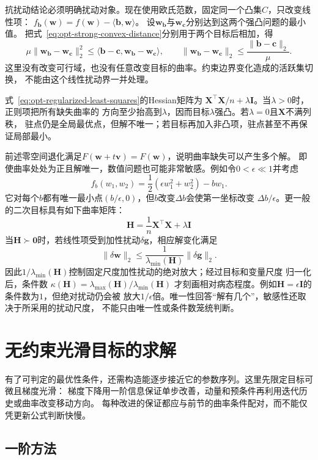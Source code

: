 抗扰动结论必须明确扰动对象。现在使用欧氏范数，固定同一个凸集$C$，只改变线性项：
$f_{\bm b}(\bm w)=f(\bm w)-\langle\bm b,\bm w\rangle$。
设$\bm w_{\bm b}$与$\bm w_{\bm c}$分别达到这两个强凸问题的最小值。
把式~\eqref{eq:opt-strong-convex-distance}分别用于两个目标后相加，得
\[
 \mu\|\bm w_{\bm b}-\bm w_{\bm c}\|_2^2
 \leq\langle\bm b-\bm c,\bm w_{\bm b}-\bm w_{\bm c}\rangle,
 \qquad
 \|\bm w_{\bm b}-\bm w_{\bm c}\|_2\leq\frac{\|\bm b-\bm c\|_2}{\mu}.
\]
这里没有改变可行域，也没有任意改变目标的曲率。约束边界变化造成的活跃集切换，
不能由这个线性扰动界一并处理。

式~\eqref{eq:opt-regularized-least-squares}的Hessian矩阵为
$\bm{X}^{\top}\bm{X}/n+\lambda\bm{I}$。当$\lambda>0$时，正则项把所有缺失曲率的
方向至少抬高到$\lambda$，因而目标$\lambda$强凸。若$\lambda=0$且$\bm{X}$不满列秩，
驻点仍是全局最优点，但解不唯一；若目标再加入非凸项，驻点甚至不再保证局部最小。

前述零空间退化满足$F(\bm w+t\bm v)=F(\bm w)$，说明曲率缺失可以产生多个解。
即使曲率处处为正且解唯一，数值问题也可能非常敏感。例如令$0<\epsilon\ll1$并考虑
\[
  f_b(w_1,w_2)=\frac12(\epsilon w_1^2+w_2^2)-bw_1.
\]
它对每个$b$都有唯一最小点$(b/\epsilon,0)$，但$b$改变$\Delta b$会使第一坐标改变
$\Delta b/\epsilon$。更一般的二次目标具有如下曲率矩阵：
\[
  \bm{H}=\frac{1}{n}\bm{X}^{\top}\bm{X}+\lambda\bm{I}
\]
当$\bm{H}\succ\bm{0}$时，若线性项受到加性扰动$\delta\bm{g}$，相应解变化满足
\[
  \lVert\delta\bm{w}\rVert_2
  \leq
  \frac{1}{\lambda_{\min}(\bm{H})}
  \lVert\delta\bm{g}\rVert_2.
\]
因此$1/\lambda_{\min}(\bm{H})$控制固定尺度加性扰动的绝对放大；经过目标和变量尺度
归一化后，条件数
$\kappa(\bm{H})=\lambda_{\max}(\bm{H})/\lambda_{\min}(\bm{H})$
才刻画相对病态程度。例如$\bm{H}=\epsilon\bm{I}$的条件数为$1$，但绝对扰动仍会被
放大$1/\epsilon$倍。唯一性回答“解有几个”，敏感性还取决于所采用的扰动尺度，
不能只由唯一性或条件数笼统判断。

\section{无约束光滑目标的求解}
\label{sec:opt-smooth-iterative-methods}

有了可判定的最优性条件，还需构造能逐步接近它的参数序列。这里先限定目标可微且梯度光滑：
梯度下降用一阶信息保证单步改善，动量和预条件再利用迭代历史或曲率改变移动方向。
每种改进的保证都应与前节的曲率条件配对，而不能仅凭更新公式判断快慢。

\subsection{一阶方法}
\label{sec:opt-first-order-methods}

